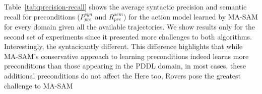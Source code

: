 \documentclass[letterpaper]{article} %
\newcommand{\pre}{\textit{pre}}
\theoremstyle{definition}
\theoremstyle{remark}
\newcommand{\masam}{\ac{MA-SAM}\xspace}
\begin{document}
Table~\ref{tab:precision-recall} shows the average syntactic precision and semantic recall for preconditions ($P^{syn}_\pre$ and $R^{sem}_\pre$) for the action model learned by \masam for every domain given all the available trajectories. We show results only for the second set of experiments since it presented more challenges to both algorithms. Interestingly, the syntacicantly different.
This difference highlights that while \masam's conservative approach to learning preconditions indeed learns more preconditions than those appearing in the PDDL domain, in most cases, these additional preconditions do not affect the 
Here too, Rovers pose the greatest challenge to \masam 





\end{document}
